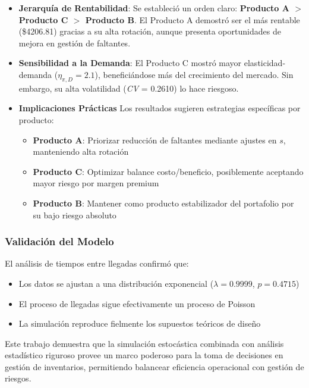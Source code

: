 \documentclass{report}
\begin{document}
    \begin{itemize}
        \item \textbf{Jerarquía de Rentabilidad}: Se estableció un orden claro: \textbf{Producto A $>$ Producto C $>$ Producto B}. El Producto A demostró ser el más rentable (\$4206.81) gracias a su alta rotación, aunque presenta oportunidades de mejora en gestión de faltantes.
        
        \item \textbf{Sensibilidad a la Demanda}: El Producto C mostró mayor elasticidad-demanda ($\eta_{\pi,D} = 2.1$), beneficiándose más del crecimiento del mercado. Sin embargo, su alta volatilidad (\textit{CV} = 0.2610) lo hace riesgoso.
        
        \item \textbf{Implicaciones Prácticas}
        Los resultados sugieren estrategias específicas por producto:
        \begin{itemize}
            \item \textbf{Producto A}: Priorizar reducción de faltantes mediante ajustes en $s$, manteniendo alta rotación
            \item \textbf{Producto C}: Optimizar balance costo/beneficio, posiblemente aceptando mayor riesgo por margen premium
            \item \textbf{Producto B}: Mantener como producto estabilizador del portafolio por su bajo riesgo absoluto
        \end{itemize}
    \end{itemize}

    \subsubsection{Validación del Modelo}
    El análisis de tiempos entre llegadas confirmó que:
    \begin{itemize}
        \item Los datos se ajustan a una distribución exponencial ($\lambda=0.9999$, $p=0.4715$)
        \item El proceso de llegadas sigue efectivamente un proceso de Poisson
        \item La simulación reproduce fielmente los supuestos teóricos de diseño
    \end{itemize}

    Este trabajo demuestra que la simulación estocástica combinada con análisis estadístico riguroso provee un marco poderoso para la toma de decisiones en gestión de inventarios, permitiendo balancear eficiencia operacional con gestión de riesgos.
\end{document}
